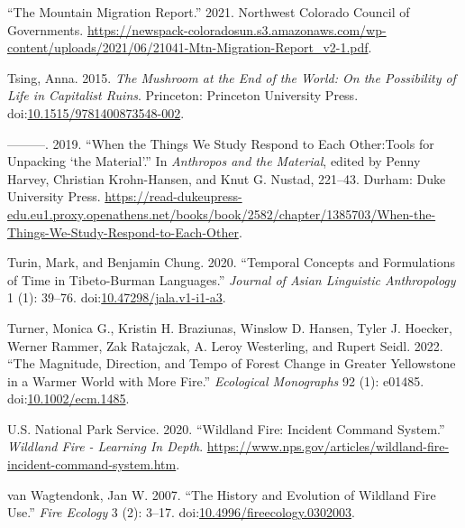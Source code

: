 \documentclass[
]{article}
\newlength{\cslhangindent}
\newenvironment{CSLReferences}[2] %
 {\begin{list}{}{%
  \setlength{\itemindent}{0pt}
  \setlength{\leftmargin}{0pt}
  \setlength{\parsep}{0pt}
  \ifodd #1
   \setlength{\leftmargin}{\cslhangindent}
   \setlength{\itemindent}{-1\cslhangindent}
  \fi
  \setlength{\itemsep}{#2\baselineskip}}}
 {\end{list}}
\begin{document}
\begin{CSLReferences}{1}{0}
{``The {Mountain Migration Report}.''} 2021. Northwest Colorado Council of Governments. \url{https://newspack-coloradosun.s3.amazonaws.com/wp-content/uploads/2021/06/21041-Mtn-Migration-Report_v2-1.pdf}.

Tsing, Anna. 2015. \emph{The {Mushroom} at the {End} of the {World}: {On} the {Possibility} of {Life} in {Capitalist Ruins}}. Princeton: Princeton University Press. doi:\href{https://doi.org/10.1515/9781400873548-002}{10.1515/9781400873548-002}.

---------. 2019. {``When the {Things We Study Respond} to {Each Other}:{Tools} for {Unpacking} {`the {Material}'}.''} In \emph{Anthropos and the {Material}}, edited by Penny Harvey, Christian Krohn-Hansen, and Knut G. Nustad, 221--43. Durham: Duke University Press. \url{https://read-dukeupress-edu.eu1.proxy.openathens.net/books/book/2582/chapter/1385703/When-the-Things-We-Study-Respond-to-Each-Other}.

Turin, Mark, and Benjamin Chung. 2020. {``Temporal {Concepts} and {Formulations} of {Time} in {Tibeto-Burman Languages}.''} \emph{Journal of Asian Linguistic Anthropology} 1 (1): 39--76. doi:\href{https://doi.org/10.47298/jala.v1-i1-a3}{10.47298/jala.v1-i1-a3}.

Turner, Monica G., Kristin H. Braziunas, Winslow D. Hansen, Tyler J. Hoecker, Werner Rammer, Zak Ratajczak, A. Leroy Westerling, and Rupert Seidl. 2022. {``The Magnitude, Direction, and Tempo of Forest Change in {Greater Yellowstone} in a Warmer World with More Fire.''} \emph{Ecological Monographs} 92 (1): e01485. doi:\href{https://doi.org/10.1002/ecm.1485}{10.1002/ecm.1485}.

U.S. National Park Service. 2020. {``Wildland {Fire}: {Incident Command System}.''} \emph{Wildland Fire - Learning In Depth}. \url{https://www.nps.gov/articles/wildland-fire-incident-command-system.htm}.

van Wagtendonk, Jan W. 2007. {``The {History} and {Evolution} of {Wildland Fire Use}.''} \emph{Fire Ecology} 3 (2): 3--17. doi:\href{https://doi.org/10.4996/fireecology.0302003}{10.4996/fireecology.0302003}.


\end{CSLReferences}
\end{document}
